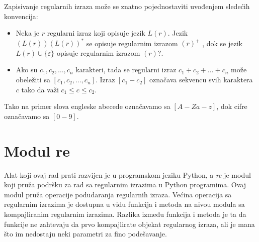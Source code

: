 \documentclass[12pt,oneside]{memoir}
\theoremstyle{plain}
\theoremstyle{definition}
\begin{document}
Zapisivanje regularnih izraza može se znatno pojednostaviti uvođenjem sledećih konvencija:
\begin{itemize}
\item Neka je $r$ regularni izraz koji opisuje jezik $L(r)$. Jezik $(L(r))(L(r))^*$ se opisuje regularnim izrazom $(r)^+$ , dok se jezik $L(r) \cup \{\varepsilon\}$ opisuje regularnim izrazom $(r)?$.
\item Ako su $c_1, c_2, …, c_n$ karakteri, tada se regularni izraz $c_1 + c_2 + … + c_n$ može obeležiti sa $[c_1, c_2, …, c_n]$. Izraz $[c_1-c_2]$ označava sekvencu svih karaktera $c$ tako da važi $c_1 \leq c \leq c_2$.
\end{itemize}

Tako na primer slova engleske abecede označavamo sa $[A-Za-z]$, dok cifre označavamo sa $[0-9]$.
 
\section{Modul re}

Alat koji ovaj rad prati razvijen je u programskom jeziku Python, a \textit{re} je modul koji pruža podršku za rad sa regularnim izrazima u Python programima. Ovaj modul pruža operacije podudaranja regularnih izraza. Većina operacija sa regularnim izrazima je dostupna u vidu funkcija i metoda na nivou modula sa kompajliranim regularnim izrazima. Razlika između funkcija i metoda je ta da funkcije ne zahtevaju da prvo kompajlirate objekat regularnog izraza, ali je mana što im nedostaju neki parametri za fino podešavanje. 
\end{document}

